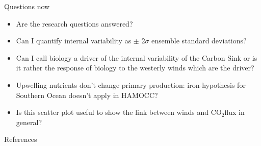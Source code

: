 \documentclass[aspectratio=169]{beamer}
\begin{document}
\begin{frame}{Questions now}
\begin{itemize}
\Large
\item Are the research questions answered?
\item Can I quantify internal variability as $\pm$ 2$\sigma$ ensemble standard deviations? 
\item Can I call biology a driver of the internal variability of the Carbon Sink or is it rather the response of biology to the westerly winds which are the driver?
\item Upwelling nutrients don't change primary production: iron-hypothesis for Southern Ocean doesn't apply in HAMOCC?
\item Is this scatter plot useful to show the link between winds and CO$_2$flux in general?
\end{itemize}
\end{frame}
	
\appendix

\begin{frame}[allowframebreaks]{References}
\baselineskip12pt



\end{frame}	
	
	
	
\end{document}
